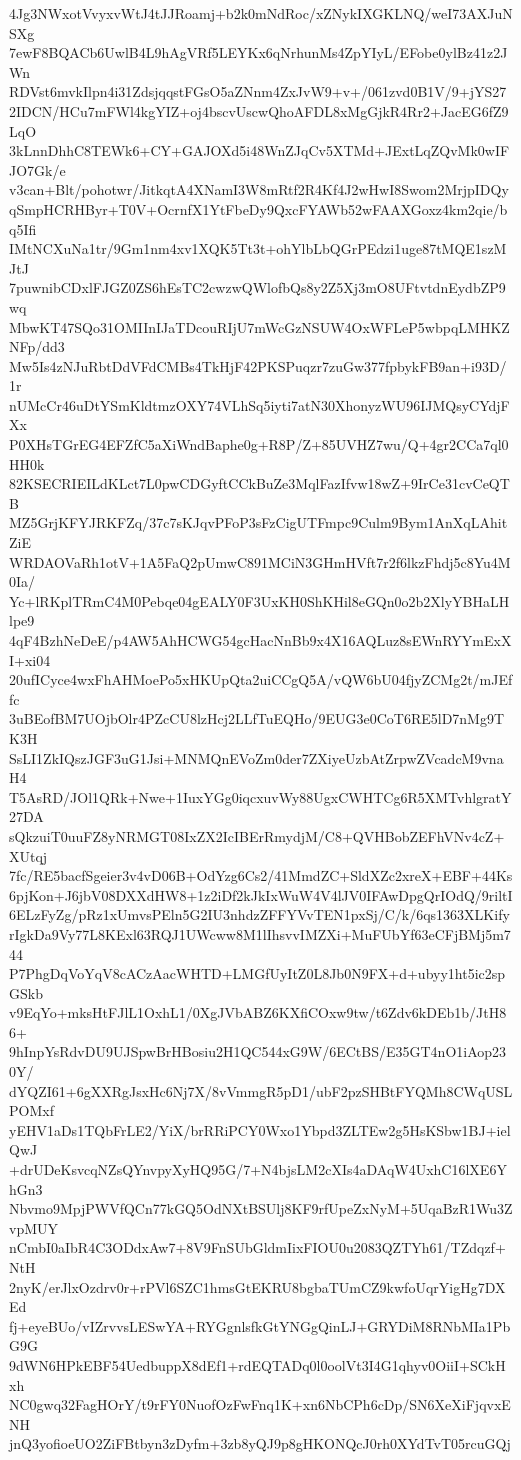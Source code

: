 4Jg3NWxotVvyxvWtJ4tJJRoamj+b2k0mNdRoc/xZNykIXGKLNQ/weI73AXJuNSXg
7ewF8BQACb6UwlB4L9hAgVRf5LEYKx6qNrhunMs4ZpYIyL/EFobe0ylBz41z2JWn
RDVst6mvkIlpn4i31ZdsjqqstFGsO5aZNnm4ZxJvW9+v+/061zvd0B1V/9+jYS27
2IDCN/HCu7mFWl4kgYIZ+oj4bscvUscwQhoAFDL8xMgGjkR4Rr2+JacEG6fZ9LqO
3kLnnDhhC8TEWk6+CY+GAJOXd5i48WnZJqCv5XTMd+JExtLqZQvMk0wIFJO7Gk/e
v3can+Blt/pohotwr/JitkqtA4XNamI3W8mRtf2R4Kf4J2wHwI8Swom2MrjpIDQy
qSmpHCRHByr+T0V+OcrnfX1YtFbeDy9QxcFYAWb52wFAAXGoxz4km2qie/bq5Ifi
IMtNCXuNa1tr/9Gm1nm4xv1XQK5Tt3t+ohYlbLbQGrPEdzi1uge87tMQE1szMJtJ
7puwnibCDxlFJGZ0ZS6hEsTC2cwzwQWlofbQs8y2Z5Xj3mO8UFtvtdnEydbZP9wq
MbwKT47SQo31OMIInIJaTDcouRIjU7mWcGzNSUW4OxWFLeP5wbpqLMHKZNFp/dd3
Mw5Is4zNJuRbtDdVFdCMBs4TkHjF42PKSPuqzr7zuGw377fpbykFB9an+i93D/1r
nUMcCr46uDtYSmKldtmzOXY74VLhSq5iyti7atN30XhonyzWU96IJMQsyCYdjFXx
P0XHsTGrEG4EFZfC5aXiWndBaphe0g+R8P/Z+85UVHZ7wu/Q+4gr2CCa7ql0HH0k
82KSECRIEILdKLct7L0pwCDGyftCCkBuZe3MqlFazIfvw18wZ+9IrCe31cvCeQTB
MZ5GrjKFYJRKFZq/37c7sKJqvPFoP3sFzCigUTFmpc9Culm9Bym1AnXqLAhitZiE
WRDAOVaRh1otV+1A5FaQ2pUmwC891MCiN3GHmHVft7r2f6lkzFhdj5c8Yu4M0Ia/
Yc+lRKplTRmC4M0Pebqe04gEALY0F3UxKH0ShKHil8eGQn0o2b2XlyYBHaLHlpe9
4qF4BzhNeDeE/p4AW5AhHCWG54gcHacNnBb9x4X16AQLuz8sEWnRYYmExXI+xi04
20ufICyce4wxFhAHMoePo5xHKUpQta2uiCCgQ5A/vQW6bU04fjyZCMg2t/mJEffc
3uBEofBM7UOjbOlr4PZcCU8lzHcj2LLfTuEQHo/9EUG3e0CoT6RE5lD7nMg9TK3H
SsLI1ZkIQszJGF3uG1Jsi+MNMQnEVoZm0der7ZXiyeUzbAtZrpwZVcadcM9vnaH4
T5AsRD/JOl1QRk+Nwe+1IuxYGg0iqcxuvWy88UgxCWHTCg6R5XMTvhlgratY27DA
sQkzuiT0uuFZ8yNRMGT08IxZX2IcIBErRmydjM/C8+QVHBobZEFhVNv4cZ+XUtqj
7fc/RE5bacfSgeier3v4vD06B+OdYzg6Cs2/41MmdZC+SldXZc2xreX+EBF+44Ks
6pjKon+J6jbV08DXXdHW8+1z2iDf2kJkIxWuW4V4lJV0IFAwDpgQrIOdQ/9riltI
6ELzFyZg/pRz1xUmvsPEln5G2IU3nhdzZFFYVvTEN1pxSj/C/k/6qs1363XLKify
rIgkDa9Vy77L8KExl63RQJ1UWcww8M1lIhsvvIMZXi+MuFUbYf63eCFjBMj5m744
P7PhgDqVoYqV8cACzAacWHTD+LMGfUyItZ0L8Jb0N9FX+d+ubyy1ht5ic2spGSkb
v9EqYo+mksHtFJlL1OxhL1/0XgJVbABZ6KXfiCOxw9tw/t6Zdv6kDEb1b/JtH86+
9hInpYsRdvDU9UJSpwBrHBosiu2H1QC544xG9W/6ECtBS/E35GT4nO1iAop230Y/
dYQZI61+6gXXRgJsxHc6Nj7X/8vVmmgR5pD1/ubF2pzSHBtFYQMh8CWqUSLPOMxf
yEHV1aDs1TQbFrLE2/YiX/brRRiPCY0Wxo1Ybpd3ZLTEw2g5HsKSbw1BJ+ielQwJ
+drUDeKsvcqNZsQYnvpyXyHQ95G/7+N4bjsLM2cXIs4aDAqW4UxhC16lXE6YhGn3
Nbvmo9MpjPWVfQCn77kGQ5OdNXtBSUlj8KF9rfUpeZxNyM+5UqaBzR1Wu3ZvpMUY
nCmbI0aIbR4C3ODdxAw7+8V9FnSUbGldmIixFIOU0u2083QZTYh61/TZdqzf+NtH
2nyK/erJlxOzdrv0r+rPVl6SZC1hmsGtEKRU8bgbaTUmCZ9kwfoUqrYigHg7DXEd
fj+eyeBUo/vIZrvvsLESwYA+RYGgnlsfkGtYNGgQinLJ+GRYDiM8RNbMIa1PbG9G
9dWN6HPkEBF54UedbuppX8dEf1+rdEQTADq0l0oolVt3I4G1qhyv0OiiI+SCkHxh
NC0gwq32FagHOrY/t9rFY0NuofOzFwFnq1K+xn6NbCPh6cDp/SN6XeXiFjqvxENH
jnQ3yofioeUO2ZiFBtbyn3zDyfm+3zb8yQJ9p8gHKONQcJ0rh0XYdTvT05rcuGQj
